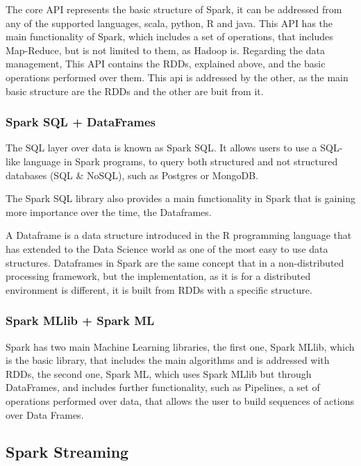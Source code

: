 \documentclass[11pt]{book} %
\begin{document}
          The core API represents the basic structure of Spark, it can be addressed from any of the supported languages, scala, python, R and java. This API has the main functionality of Spark, which includes a set of operations, that includes Map-Reduce, but is not limited to them, as Hadoop is.
          Regarding the data management, This API contains the RDDs, explained above, and the basic operations performed over them. This api is addressed by the other, as the main basic structure are the RDDs and the other are buit from it.

        \subsubsection{Spark SQL + DataFrames}

          The SQL layer over data is known as Spark SQL. It allows users to use a SQL-like language in Spark programs, to query both structured and not structured databases (SQL \& NoSQL), such as Postgres or MongoDB.

          The Spark SQL library also provides a main functionality in Spark that is gaining more importance over the time, the Dataframes.

          A Dataframe is a data structure introduced in the R programming language that has extended to the Data Science world as one of the most easy to use data structures. Dataframes in Spark are the same concept that in a non-distributed processing framework, but the implementation, as it is for a distributed environment is different, it is built from RDDs with a specific structure.

        \subsubsection{Spark MLlib + Spark ML}

          Spark has two main Machine Learning libraries, the first one, Spark MLlib, which is the basic library, that includes the main algorithms and is addressed with RDDs, the second one, Spark ML, which uses Spark MLlib but through DataFrames, and includes further functionality, such as Pipelines, a set of operations performed over data, that allows the user to build sequences of actions over Data Frames.

        \subsection{Spark Streaming}
\end{document}
